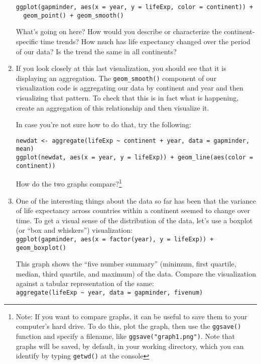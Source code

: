 \documentclass[a4paper,12pt]{article}
\begin{document}
\begin{enumerate}
\begin{verbatim}
ggplot(gapminder, aes(x = year, y = lifeExp, color = continent)) + 
  geom_point() + geom_smooth()
\end{verbatim}

What's going on here? How would you describe or characterize the continent-specific time trends?  How much has life expectancy changed over the period of our data? Is the trend the same in all continents?

\item If you look closely at this last visualization, you should see that it is displaying an aggregation. The \texttt{geom\_smooth()} component of our visualization code is aggregating our data by continent and year and then visualizing that pattern. To check that this is in fact what is happening, create an aggregation of this relationship and then visualize it.

In case you're not sure how to do that, try the following:

\begin{verbatim}
newdat <- aggregate(lifeExp ~ continent + year, data = gapminder, mean)
ggplot(newdat, aes(x = year, y = lifeExp)) + geom_line(aes(color = continent))
\end{verbatim}

How do the two graphs compare?\footnote{Note: If you want to compare graphs, it can be useful to save them to your computer's hard drive. To do this, plot the graph, then use the \texttt{ggsave()} function and specify a filename, like \texttt{ggsave("graph1.png")}. Note that graphs will be saved, by default, in your working directory, which you can identify by typing \texttt{getwd()} at the console}

\item One of the interesting things about the data so far has been that the variance of life expectancy across countries within a continent seemed to change over time. To get a visual sense of the distribution of the data, let's use a boxplot (or ``box and whiskers'') visualization:\\

\texttt{ggplot(gapminder, aes(x = factor(year), y = lifeExp)) + geom\_boxplot()}

This graph shows the ``five number summary'' (minimum, first quartile, median, third quartile, and maximum) of the data. Compare the visualization against a tabular representation of the same:\\

\texttt{aggregate(lifeExp \~{} year, data = gapminder, fivenum)}


\end{enumerate}
\end{document}
